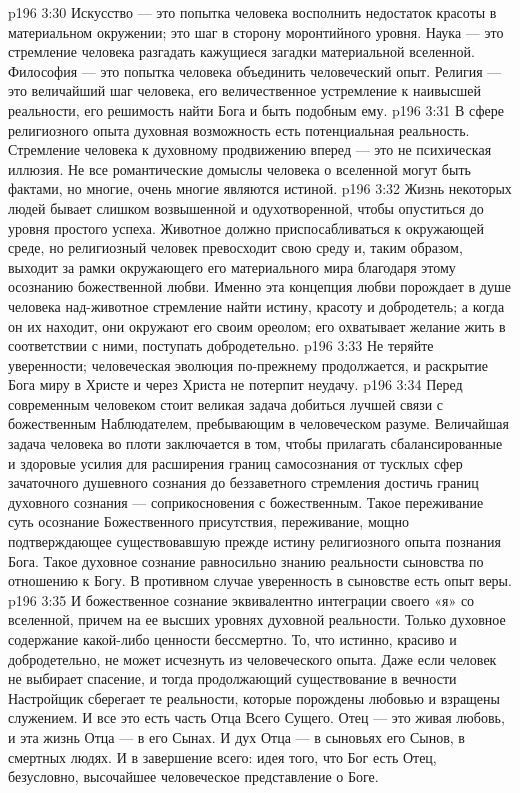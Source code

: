 \vs p196 3:30 \pc Искусство --- это попытка человека восполнить недостаток красоты в материальном окружении; это шаг в сторону моронтийного уровня. Наука --- это стремление человека разгадать кажущиеся загадки материальной вселенной. Философия --- это попытка человека объединить человеческий опыт. Религия --- это величайший шаг человека, его величественное устремление к наивысшей реальности, его решимость найти Бога и быть подобным ему.
\vs p196 3:31 \pc В сфере религиозного опыта духовная возможность есть потенциальная реальность. Стремление человека к духовному продвижению вперед --- это не психическая иллюзия. Не все романтические домыслы человека о вселенной могут быть фактами, но многие, очень многие являются истиной.
\vs p196 3:32 Жизнь некоторых людей бывает слишком возвышенной и одухотворенной, чтобы опуститься до уровня простого успеха. Животное должно приспосабливаться к окружающей среде, но религиозный человек превосходит свою среду и, таким образом, выходит за рамки окружающего его материального мира благодаря этому осознанию божественной любви. Именно эта концепция любви порождает в душе человека над\hyp{}животное стремление найти истину, красоту и добродетель; а когда он их находит, они окружают его своим ореолом; его охватывает желание жить в соответствии с ними, поступать добродетельно.
\vs p196 3:33 Не теряйте уверенности; человеческая эволюция по\hyp{}прежнему продолжается, и раскрытие Бога миру в Христе и через Христа не потерпит неудачу.
\vs p196 3:34 Перед современным человеком стоит великая задача добиться лучшей связи с божественным Наблюдателем, пребывающим в человеческом разуме. Величайшая задача человека во плоти заключается в том, чтобы прилагать сбалансированные и здоровые усилия для расширения границ самосознания от тусклых сфер зачаточного душевного сознания до беззаветного стремления достичь границ духовного сознания --- соприкосновения с божественным. Такое переживание суть осознание Божественного присутствия, переживание, мощно подтверждающее существовавшую прежде истину религиозного опыта познания Бога. Такое духовное сознание равносильно знанию реальности сыновства по отношению к Богу. В противном случае уверенность в сыновстве есть опыт веры.
\vs p196 3:35 И божественное сознание эквивалентно интеграции своего «я» со вселенной, причем на ее высших уровнях духовной реальности. Только духовное содержание какой\hyp{}либо ценности бессмертно. То, что истинно, красиво и добродетельно, не может исчезнуть из человеческого опыта. Даже если человек не выбирает спасение, и тогда продолжающий существование в вечности Настройщик сберегает те реальности, которые порождены любовью и взращены служением. И все это есть часть Отца Всего Сущего. Отец --- это живая любовь, и эта жизнь Отца --- в его Сынах. И дух Отца --- в сыновьях его Сынов, в смертных людях. И в завершение всего: идея того, что Бог есть Отец, безусловно, высочайшее человеческое представление о Боге.
\separatorline
